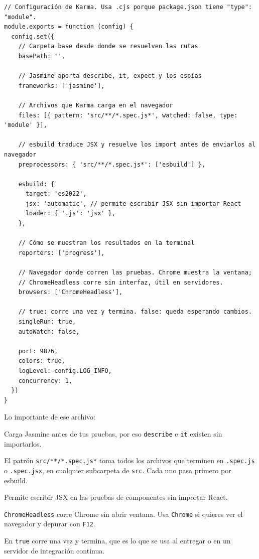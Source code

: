 \documentclass[11pt,a4paper]{article}
\newcommand{\cmd}[1]{\texttt{\color{reactdark}#1}}
\begin{document}
\begin{lstlisting}[language=JSX,title={\small\ttfamily karma.conf.cjs}]
// Configuración de Karma. Usa .cjs porque package.json tiene "type": "module".
module.exports = function (config) {
  config.set({
    // Carpeta base desde donde se resuelven las rutas
    basePath: '',

    // Jasmine aporta describe, it, expect y los espías
    frameworks: ['jasmine'],

    // Archivos que Karma carga en el navegador
    files: [{ pattern: 'src/**/*.spec.js*', watched: false, type: 'module' }],

    // esbuild traduce JSX y resuelve los import antes de enviarlos al navegador
    preprocessors: { 'src/**/*.spec.js*': ['esbuild'] },

    esbuild: {
      target: 'es2022',
      jsx: 'automatic', // permite escribir JSX sin importar React
      loader: { '.js': 'jsx' },
    },

    // Cómo se muestran los resultados en la terminal
    reporters: ['progress'],

    // Navegador donde corren las pruebas. Chrome muestra la ventana;
    // ChromeHeadless corre sin interfaz, útil en servidores.
    browsers: ['ChromeHeadless'],

    // true: corre una vez y termina. false: queda esperando cambios.
    singleRun: true,
    autoWatch: false,

    port: 9876,
    colors: true,
    logLevel: config.LOG_INFO,
    concurrency: 1,
  })
}
\end{lstlisting}

Lo importante de ese archivo:
\begin{description}[leftmargin=0pt, style=nextline, itemsep=0.4em]
\item[\texttt{frameworks: ['jasmine']}] Carga Jasmine antes de tus pruebas, por eso \cmd{describe} e \cmd{it} existen sin importarlos.
\item[\texttt{files} y \texttt{preprocessors}] El patrón \cmd{src/**/*.spec.js*} toma todos los archivos que terminen en \cmd{.spec.js} o \cmd{.spec.jsx}, en cualquier subcarpeta de \cmd{src}. Cada uno pasa primero por esbuild.
\item[\texttt{esbuild.jsx: 'automatic'}] Permite escribir JSX en las pruebas de componentes sin importar React.
\item[\texttt{browsers}] \cmd{ChromeHeadless} corre Chrome sin abrir ventana. Usa \cmd{Chrome} si quieres ver el navegador y depurar con \cmd{F12}.
\item[\texttt{singleRun}] En \cmd{true} corre una vez y termina, que es lo que se usa al entregar o en un servidor de integración continua.
\end{description}
\end{document}
